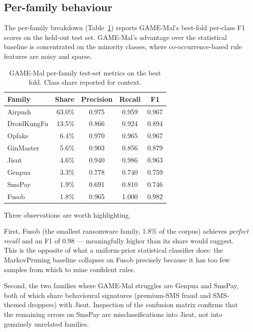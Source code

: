 \subsection{Per-family behaviour}

The per-family breakdown (Table~\ref{tab:perclass}) reports
GAME-Mal's best-fold per-class F1 scores on the held-out test set.
GAME-Mal's advantage over the statistical baseline is concentrated
on the minority classes, where co-occurrence-based rule features
are noisy and sparse.

\begin{table}[t]
\centering
\caption{GAME-Mal per-family test-set metrics on the best fold.
Class share reported for context.}
\label{tab:perclass}
\small
\begin{tabular}{lrccc}
\toprule
Family & Share & Precision & Recall & F1 \\
\midrule
Airpush      & 63.0\% & 0.975 & 0.959 & 0.967 \\
DroidKungFu  & 13.5\% & 0.866 & 0.924 & 0.894 \\
Opfake       & 6.4\%  & 0.970 & 0.965 & 0.967 \\
GinMaster    & 5.6\%  & 0.903 & 0.856 & 0.879 \\
Jisut        & 4.6\%  & 0.940 & 0.986 & 0.963 \\
Genpua       & 3.3\%  & 0.778 & 0.740 & 0.759 \\
SmsPay       & 1.9\%  & 0.691 & 0.810 & 0.746 \\
Fusob        & 1.8\%  & 0.965 & 1.000 & 0.982 \\
\bottomrule
\end{tabular}
\end{table}

Three observations are worth highlighting.

First, Fusob (the smallest ransomware family, 1.8\% of the corpus)
achieves \emph{perfect recall} and an F1 of 0.98 --- meaningfully
higher than its share would suggest. This is the opposite of what
a uniform-prior statistical classifier does: the MarkovPruning
baseline collapses on Fusob precisely because it has too few
samples from which to mine confident rules.

Second, the two families where GAME-Mal struggles are Genpua and
SmsPay, both of which share behavioural signatures (premium-SMS
fraud and SMS-themed droppers) with Jisut. Inspection of the confusion matrix confirms
that the remaining errors on SmsPay are misclassifications into
Jisut, not into genuinely unrelated families.

